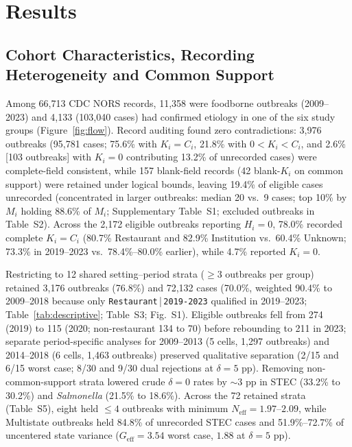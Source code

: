 \section{Results}\label{sec:results}

\subsection{Cohort Characteristics, Recording Heterogeneity and Common Support}\label{sec:res-cohort}

Among 66,713 CDC NORS records, 11,358 were foodborne outbreaks (2009--2023) and 4,133 (103,040 cases) had confirmed etiology in one of the six study groups (Figure~\ref{fig:flow}). Record auditing found zero contradictions: 3,976 outbreaks (95,781 cases; 75.6\% with $K_i = C_i$, 21.8\% with $0 < K_i < C_i$, and 2.6\% [103 outbreaks] with $K_i = 0$ contributing 13.2\% of unrecorded cases) were complete-field consistent, while 157 blank-field records (42 blank-$K_i$ on common support) were retained under logical bounds, leaving 19.4\% of eligible cases unrecorded (concentrated in larger outbreaks: median 20 vs.\ 9 cases; top 10\% by $M_i$ holding 88.6\% of $M_i$; Supplementary Table~S1; excluded outbreaks in Table~S2). Across the 2,172 eligible outbreaks reporting $H_i = 0$, 78.0\% recorded complete $K_i = C_i$ (80.7\% Restaurant and 82.9\% Institution vs.\ 60.4\% Unknown; 73.3\% in 2019--2023 vs.\ 78.4\%--80.0\% earlier), while 4.7\% reported $K_i = 0$.

Restricting to 12 shared setting--period strata ($\ge 3$ outbreaks per group) retained 3,176 outbreaks (76.8\%) and 72,132 cases (70.0\%, weighted 90.4\% to 2009--2018 because only \texttt{Restaurant}\,|\,\texttt{2019-2023} qualified in 2019--2023; Table~\ref{tab:descriptive}; Table~S3; Fig.~S1). Eligible outbreaks fell from 274 (2019) to 115 (2020; non-restaurant 134 to 70) before rebounding to 211 in 2023; separate period-specific analyses for 2009--2013 (5 cells, 1,297 outbreaks) and 2014--2018 (6 cells, 1,463 outbreaks) preserved qualitative separation (2/15 and 6/15 worst case; 8/30 and 9/30 dual rejections at $\delta = 5\text{ pp}$). Removing non-common-support strata lowered crude $\delta = 0$ rates by $\sim 3\text{ pp}$ in STEC (33.2\% to 30.2\%) and \textit{Salmonella} (21.5\% to 18.6\%). Across the 72 retained strata (Table~S5), eight held $\le 4$ outbreaks with minimum $N_{\text{eff}} = 1.97$--$2.09$, while Multistate outbreaks held 84.8\% of unrecorded STEC cases and 51.9\%--72.7\% of uncentered state variance ($G_{\text{eff}} = 3.54$ worst case, $1.88$ at $\delta = 5\text{ pp}$).

